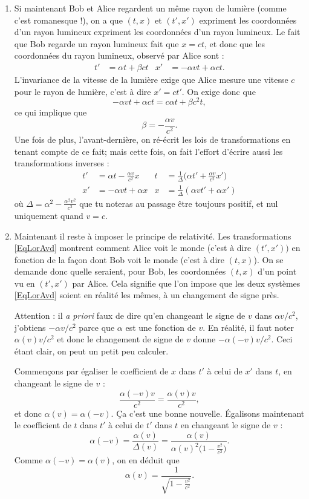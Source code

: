 \documentclass[a4paper,12pt]{book}
\theoremstyle{mes_exemples}	\newtheorem{exemple}[numtho]{Exemple}
\theoremstyle{mes_tho}
\begin{document}
\begin{enumerate}
\item Si maintenant Bob et Alice regardent un même rayon de lumière (comme c'est romanesque !), on a que $(t,x)$ et $(t',x')$ expriment les coordonnées d'un rayon lumineux expriment les coordonnées d'un rayon lumineux. Le fait que Bob regarde un rayon lumineux fait que $x=ct$, et donc que les coordonnées du rayon lumineux, observé par Alice sont :
\begin{align}
   t'&=\alpha t+\beta ct	&x'&=-\alpha v t+\alpha c t.
\end{align}
L'invariance de la vitesse de la lumière exige que Alice mesure une vitesse $c$ pour le rayon de lumière, c'est à dire $x'=ct'$. On exige donc que
\[ 
  -\alpha v t+\alpha ct=c\alpha t+\beta c^2t,
\]
ce qui implique que 
\[ 
  \beta=-\frac{ \alpha v }{ c^2 }.
\]
Une fois de plus, l'avant-dernière,  on ré-écrit les lois de transformations en tenant compte de ce fait; mais cette fois, on fait l'effort d'écrire aussi les transformations inverses :
\begin{align}	\label{EqLorAvd}
t'&=\alpha t-\frac{ \alpha v }{ c^2 }x		& t&=\frac{1}{ \Delta }\big( \alpha t'+\frac{ \alpha v }{ c^2 }x' \big)\\
x'&=-\alpha vt+\alpha x				& x&=\frac{1}{ \Delta }(\alpha v t'+\alpha x')
\end{align}
où $\Delta=\alpha^2-\frac{ \alpha^2 v^2 }{ c^2 }$ que tu noteras au passage être toujours positif, et nul uniquement quand $v=c$.

\item Maintenant il reste à imposer le principe de relativité. Les transformations \eqref{EqLorAvd} montrent comment Alice voit le monde (c'est à dire $(t',x'))$ en fonction de la façon dont Bob voit le monde (c'est à dire $(t,x)$). On se demande donc quelle seraient, pour Bob, les coordonnées $(t,x)$ d'un point vu en $(t',x')$ par Alice. Cela signifie que l'on impose que les deux systèmes \eqref{EqLorAvd} soient en réalité les mêmes, à un changement de signe près.

Attention : il \emph{a priori} faux de dire qu'en changeant le signe de $v$ dans $\alpha v/c^2$, j'obtiens $-\alpha v/c^2$ parce que $\alpha$ est une fonction de $v$. En réalité, il faut noter $\alpha(v)v/c^2$ et donc le changement de signe de $v$ donne $-\alpha(-v)v/c^2$. Ceci étant clair, on peut un petit peu calculer.

Commençons par égaliser le coefficient de $x$ dans $t'$ à celui de $x'$ dans $t$, en changeant le signe de $v$ :
\[ 
  \frac{ \alpha(-v)v }{ c^2 }=\frac{ \alpha(v)v }{ c^2 },
\]
 et donc $\alpha(v)=\alpha(-v)$. Ça c'est une bonne nouvelle. Égalisons maintenant le coefficient de $t$ dans $t'$ à celui de $t'$ dans $t$ en changeant le signe de $v$ :
\[ 
  \alpha(-v)=\frac{ \alpha(v) }{ \Delta(v) }=\frac{ \alpha(v) }{ \alpha(v)^2\big( 1-\frac{ v^2 }{ c^2 } \big) }.
\]
Comme $\alpha(-v)=\alpha(v)$, on en déduit que
\begin{equation}		\label{EqalphaLo}
\alpha(v)=\frac{1}{ \sqrt{1-\frac{ v^2 }{ c^2 }} }.
\end{equation}
\end{enumerate}
\end{document}
